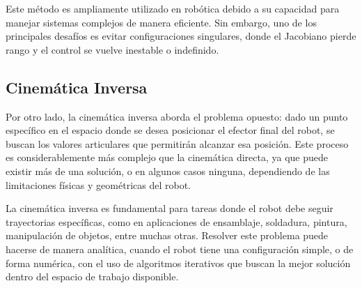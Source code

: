 Este método es ampliamente utilizado en robótica debido a su capacidad para manejar sistemas complejos de manera eficiente. Sin embargo, uno de los principales desafíos es evitar configuraciones singulares, donde el Jacobiano pierde rango y el control se vuelve inestable o indefinido.

\subsection{Cinemática Inversa}
Por otro lado, la cinemática inversa aborda el problema opuesto: dado un punto específico en el espacio donde se desea posicionar el efector final del robot, se buscan los valores articulares que permitirán alcanzar esa posición. Este proceso es considerablemente más complejo que la cinemática directa, ya que puede existir más de una solución, o en algunos casos ninguna, dependiendo de las limitaciones físicas y geométricas del robot.


La cinemática inversa es fundamental para tareas donde el robot debe seguir trayectorias específicas, como en aplicaciones de ensamblaje, soldadura, pintura, manipulación de objetos, entre muchas otras. Resolver este problema puede hacerse de manera analítica, cuando el robot tiene una configuración simple, o de forma numérica, con el uso de algoritmos iterativos que buscan la mejor solución dentro del espacio de trabajo disponible.


